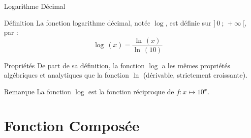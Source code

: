 \documentclass{coursbook}
\begin{document}
    \begin{Gpartie}{Logarithme Décimal} 
        \begin{Spartie}{Définition} 
            La fonction logarithme décimal, notée $\log$, est définie sur $\big]\,0~;\,+\infty~\big[$, par :
            \[\log\,(x)=\frac{\ln\,(x)}{\ln\,(10)}\]
        \end{Spartie}
        \begin{Spartie}{Propriétés} 
            De part de sa définition, la fonction $\log$ a les mêmes propriétés algébriques et analytiques que la fonction $\ln$ (dérivable, strictement croissante).
        \end{Spartie}
        \begin{Spartie}{Remarque} 
            La fonction $\log$ est la fonction réciproque de $f:x\mapsto 10^x$.
        \end{Spartie}
    \end{Gpartie}





    \chapter{Fonction Composée}
\end{document}
